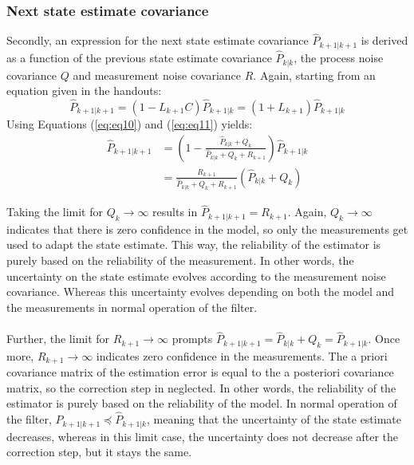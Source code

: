\documentclass[a4paper,kul]{kulakarticle} %
\begin{document}
\subsubsection*{Next state estimate covariance}
Secondly, an expression for the next state estimate covariance $\hat{P}_{k+1|k+1}$ is derived as a function of the previous state estimate covariance $\hat{P}_{k|k}$, the process noise covariance $Q$ and measurement noise covariance $R$. Again, starting from an equation given in the handouts: 
\begin{equation}
	\hat{P}_{k+1|k+1} = (1 - L_{k+1} C)\hat{P}_{k+1|k} = (1 + L_{k+1})\hat{P}_{k+1|k}
\end{equation}
Using Equations (\ref{eq:eq10}) and (\ref{eq:eq11}) yields:
\begin{equation}
	\begin{split}
	\hat{P}_{k+1|k+1} &= \left(1 - \frac{\hat{P}_{k|k} + Q_k}{\hat{P}_{k|k} + Q_k + R_{k+1}}\right) \hat{P}_{k+1|k} \\
	&= \frac{R_{k+1}}{\hat{P}_{k|k} + Q_k + R_{k+1}}\left(\hat{P}_{k|k} + Q_k\right)
	\end{split}
	\label{eq:eq13}
\end{equation}

\noindent Taking the limit for $Q_k \rightarrow \infty$ results in $\hat{P}_{k+1|k+1} = R_{k+1}$. Again,  $Q_k \rightarrow \infty$ indicates that there is zero confidence in the model, so only the measurements get used to adapt the state estimate. This way, the reliability of the estimator is purely based on the reliability of the measurement. In other words, the uncertainty on the state estimate evolves according to the measurement noise covariance. Whereas this uncertainty evolves depending on both the model and the measurements in normal operation of the filter.
\\\\
Further, the limit for $R_{k+1} \rightarrow \infty$ prompts $\hat{P}_{k+1|k+1} = \hat{P}_{k|k} + Q_k = \hat{P}_{k+1|k}$. Once more, $R_{k+1} \rightarrow \infty$ indicates zero confidence in the measurements. The a priori covariance matrix of the estimation error is equal to the a posteriori covariance matrix, so the correction step in neglected. In other words, the reliability of the estimator is purely based on the reliability of the model. In normal operation of the filter, $\hat{P}_{k+1|k+1} \preceq \hat{P}_{k+1|k}$, meaning that the uncertainty of the state estimate decreases, whereas in this limit case, the uncertainty does not decrease after the correction step, but it stays the same.
\end{document}
